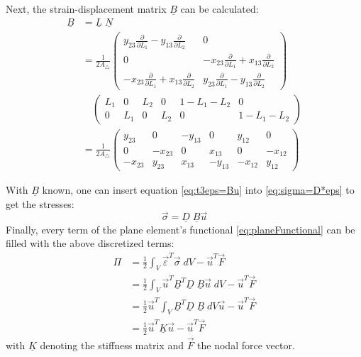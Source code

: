   Next, the strain-displacement matrix $\underline{B}$ can be calculated:
  \begin{align}
  \underline{B} &= \underline{L}\; \underline{N} \nonumber\\
  &= \frac{1}{2 A_\triangle} \begin{pmatrix}
  y_{23}\frac{\partial}{\partial L_1} - y_{13}\frac{\partial}{\partial L_2} & 0 \\
  0 & -x_{23}\frac{\partial}{\partial L_1} + x_{13}\frac{\partial}{\partial L_2} \\
  -x_{23}\frac{\partial}{\partial L_1} + x_{13}\frac{\partial}{\partial L_2} & y_{23}\frac{\partial}{\partial L_1} - y_{13}\frac{\partial}{\partial L_2}
  \end{pmatrix} \nonumber\\
  & \quad \begin{pmatrix}
  L_1 & 0 & L_2 & 0 & 1-L_1-L_2 & 0 \\
  0 & L_1 & 0 & L_2 & 0 & 1-L_1-L_2
  \end{pmatrix} \nonumber\\
  &= \frac{1}{2 A_\triangle} \begin{pmatrix}
  y_{23} & 0 & -y_{13} & 0 & y_{12} & 0 \\
  0 & -x_{23} & 0 & x_{13} & 0 & -x_{12} \\
  -x_{23} & y_{23} & x_{13} & -y_{13} & -x_{12} & y_{12}
  \end{pmatrix}
  \end{align}
  
  With $\underline{B}$ known, one can insert equation \eqref{eq:t3eps=Bu} into \eqref{eq:sigma=D*eps} to get the stresses:
  \begin{equation} \label{eq:t3sigma=DBu}
  \vec{\sigma} = \underline{D}\;\underline{B} \vec{u}
  \end{equation}
  Finally, every term of the plane element's functional \eqref{eq:planeFunctional} can be filled with the above discretized terms:
  \begin{align}\label{eq:t3functional}
  \Pi &= \frac{1}{2} \int_{V}\vec{\varepsilon}^T\vec{\sigma}\;dV - \vec{u}^T \vec{F} \nonumber\\
      &= \frac{1}{2} \int_{V}\vec{u}^T \underline{B}^T\underline{D}\;\underline{B}\vec{u}\;dV - \vec{u}^T \vec{F} \nonumber\\
      &= \frac{1}{2} \vec{u}^T \int_{V} \underline{B}^T\underline{D}\;\underline{B}\;dV \vec{u}- \vec{u}^T \vec{F} \nonumber\\
      &= \frac{1}{2}\vec{u}^T \underline{K} \vec{u} - \vec{u}^T \vec{F}
  \end{align}
  with $\underline{K}$ denoting the stiffness matrix and $\vec{F}$ the nodal force vector.
  
